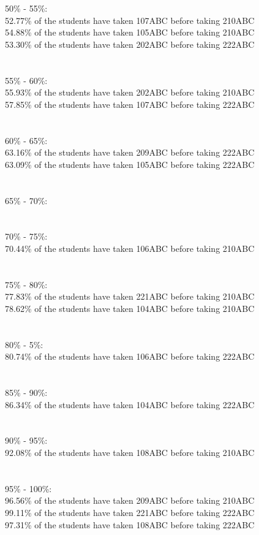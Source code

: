 50\% - 55\%:\\
52.77\% of the students have taken 107ABC before taking 210ABC\\
54.88\% of the students have taken 105ABC before taking 210ABC\\
53.30\% of the students have taken 202ABC before taking 222ABC\\
\\
\\
55\% - 60\%:\\
55.93\% of the students have taken 202ABC before taking 210ABC\\
57.85\% of the students have taken 107ABC before taking 222ABC\\
\\
\\
60\% - 65\%:\\
63.16\% of the students have taken 209ABC before taking 222ABC\\
63.09\% of the students have taken 105ABC before taking 222ABC\\
\\
\\
65\% - 70\%:\\
\\
\\
70\% - 75\%:\\
70.44\% of the students have taken 106ABC before taking 210ABC\\
\\
\\
75\% - 80\%:\\
77.83\% of the students have taken 221ABC before taking 210ABC\\
78.62\% of the students have taken 104ABC before taking 210ABC\\
\\
\\
80\% - 5\%:\\
80.74\% of the students have taken 106ABC before taking 222ABC\\
\\
\\
85\% - 90\%:\\
86.34\% of the students have taken 104ABC before taking 222ABC\\
\\
\\
90\% - 95\%:\\
92.08\% of the students have taken 108ABC before taking 210ABC\\
\\
\\
95\% - 100\%:\\
96.56\% of the students have taken 209ABC before taking 210ABC\\
99.11\% of the students have taken 221ABC before taking 222ABC\\
97.31\% of the students have taken 108ABC before taking 222ABC\\
